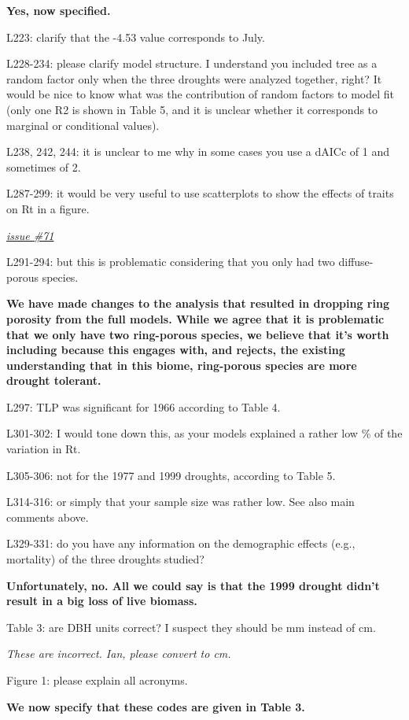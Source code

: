 \documentclass[
]{article}
\begin{document}
\textbf{Yes, now specified.}

L223: clarify that the -4.53 value corresponds to July.

L228-234: please clarify model structure. I understand you included tree
as a random factor only when the three droughts were analyzed together,
right? It would be nice to know what was the contribution of random
factors to model fit (only one R2 is shown in Table 5, and it is unclear
whether it corresponds to marginal or conditional values).

L238, 242, 244: it is unclear to me why in some cases you use a dAICc of
1 and sometimes of 2.

L287-299: it would be very useful to use scatterplots to show the
effects of traits on Rt in a figure.

\href{https://github.com/SCBI-ForestGEO/McGregor_climate-sensitivity-variation/issues/71}{\emph{issue
\#71}}

L291-294: but this is problematic considering that you only had two
diffuse-porous species.

\textbf{We have made changes to the analysis that resulted in dropping
ring porosity from the full models. While we agree that it is
problematic that we only have two ring-porous species, we believe that
it's worth including because this engages with, and rejects, the
existing understanding that in this biome, ring-porous species are more
drought tolerant.}

L297: TLP was significant for 1966 according to Table 4.

L301-302: I would tone down this, as your models explained a rather low
\% of the variation in Rt.

L305-306: not for the 1977 and 1999 droughts, according to Table 5.

L314-316: or simply that your sample size was rather low. See also main
comments above.

L329-331: do you have any information on the demographic effects (e.g.,
mortality) of the three droughts studied?

\textbf{Unfortunately, no. All we could say is that the 1999 drought
didn't result in a big loss of live biomass.}

Table 3: are DBH units correct? I suspect they should be mm instead of
cm.

\emph{These are incorrect. Ian, please convert to cm.}

Figure 1: please explain all acronyms.

\textbf{We now specify that these codes are given in Table 3.}
\end{document}
